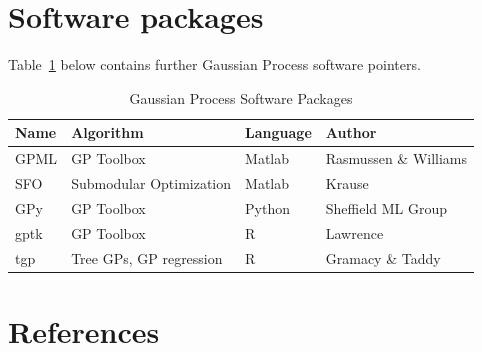 \documentclass[authoryear,11pt,review]{elsarticle}
\begin{document}
\section{Software packages}
Table~\ref{software} below contains further Gaussian Process software pointers.
\FloatBarrier
\begin{table}[h!]
\caption{Gaussian Process Software Packages}
\label{software}
\centering
{\footnotesize
 \begin{tabular}{llll}
\bf{Name} & \bf{Algorithm} & \bf{Language} & \bf{Author}\\
\hline
GPML &GP Toolbox & Matlab & Rasmussen \& Williams\\
SFO  & Submodular Optimization & Matlab & Krause\\
GPy  & GP Toolbox & Python & Sheffield ML Group \\
gptk & GP Toolbox & R & Lawrence \\
tgp & Tree GPs, GP regression& R & Gramacy \& Taddy
\end{tabular}
}
\end{table}


\section*{References}


\end{document}
